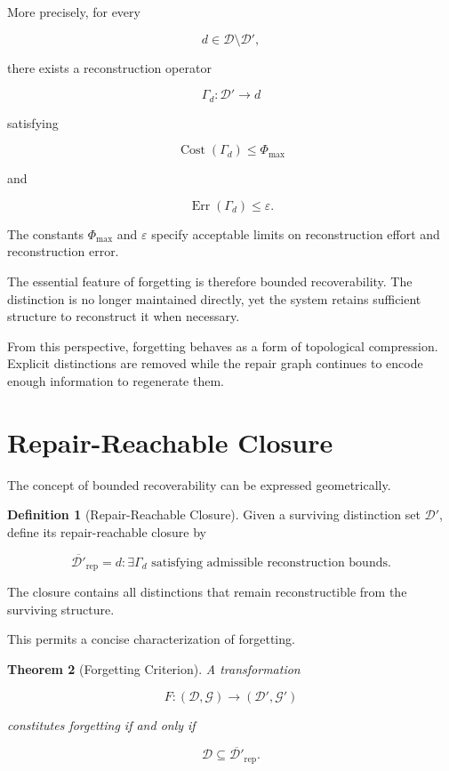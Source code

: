 \documentclass[12pt,oneside]{book}
\theoremstyle{plain} \newtheorem{theorem}{Theorem}[chapter] \newtheorem{lemma}[theorem]{Lemma} \newtheorem{proposition}[theorem]{Proposition} \newtheorem{corollary}[theorem]{Corollary}
\theoremstyle{definition} \newtheorem{definition}[theorem]{Definition} \newtheorem{axiom}[theorem]{Axiom} \newtheorem{construction}[theorem]{Construction}
\theoremstyle{remark} \newtheorem{remark}[theorem]{Remark} \newtheorem{example}[theorem]{Example}
\newcommand{\D}{\mathcal{D}} \newcommand{\R}{\mathcal{R}} \newcommand{\F}{\mathcal{F}} \newcommand{\U}{\mathcal{U}} \newcommand{\M}{\mathcal{M}} \newcommand{\G}{\Gamma}
\begin{document}
More precisely, for every

\[
d
\in
\D\setminus\D',
\]

there exists a reconstruction operator

\[
\Gamma_d
:
\D'
\rightarrow d
\]

satisfying

\[
\operatorname{Cost}(\Gamma_d)
\leq
\Phi_{\max}
\]

and

\[
\operatorname{Err}(\Gamma_d)
\leq
\varepsilon.
\]

The constants $\Phi_{\max}$ and $\varepsilon$ specify acceptable limits on reconstruction effort and reconstruction error.

The essential feature of forgetting is therefore bounded recoverability. The distinction is no longer maintained directly, yet the system retains sufficient structure to reconstruct it when necessary.

From this perspective, forgetting behaves as a form of topological compression. Explicit distinctions are removed while the repair graph continues to encode enough information to regenerate them.

\section{Repair-Reachable Closure}

The concept of bounded recoverability can be expressed geometrically.

\begin{definition}[Repair-Reachable Closure]

Given a surviving distinction set $\D'$, define its repair-reachable closure by

\[
\overline{\D'}_{\mathrm{rep}}
=
{
d
:
\exists
\Gamma_d
\text{ satisfying admissible reconstruction bounds}
}.
\]

\end{definition}

The closure contains all distinctions that remain reconstructible from the surviving structure.

This permits a concise characterization of forgetting.

\begin{theorem}[Forgetting Criterion]

A transformation

\[
F:(\D,\mathcal G)
\rightarrow
(\D',\mathcal G')
\]

constitutes forgetting if and only if

\[
\D
\subseteq
\overline{\D'}_{\mathrm{rep}}.
\]

\end{theorem}
\end{document}
